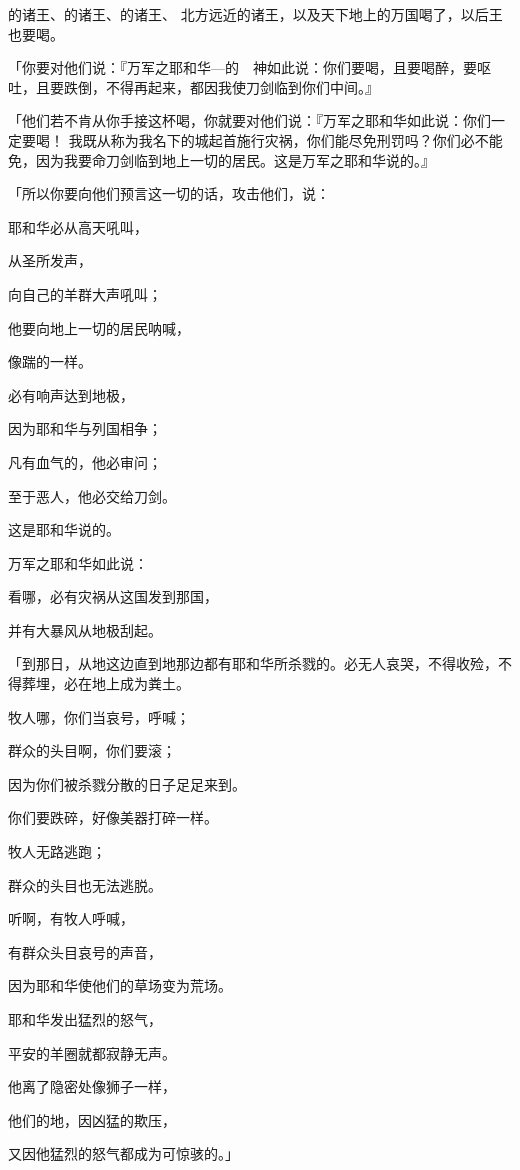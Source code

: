 {的诸王、{}的诸王、{}的诸王、
北方远近的诸王，以及天下地上的万国喝了，以后{}王也要喝。
\par }{\PP {}「你要对他们说：『万军之耶和华—{}的　神如此说：你们要喝，且要喝醉，要呕吐，且要跌倒，不得再起来，都因我使刀剑临到你们中间。』
\par }{\PP {}「他们若不肯从你手接这杯喝，你就要对他们说：『万军之耶和华如此说：你们一定要喝！
我既从称为我名下的城起首施行灾祸，你们能尽免刑罚吗？你们必不能免，因为我要命刀剑临到地上一切的居民。这是万军之耶和华说的。』
\par }{\PP {}「所以你要向他们预言这一切的话，攻击他们，说：
\par }{\Q 耶和华必从高天吼叫，
\par }{\Q 从圣所发声，
\par }{\Q 向自己的羊群大声吼叫；
\par }{\Q 他要向地上一切的居民呐喊，
\par }{\Q 像踹{}的一样。
\par }{\Q {}必有响声达到地极，
\par }{\Q 因为耶和华与列国相争；
\par }{\Q 凡有血气的，他必审问；
\par }{\Q 至于恶人，他必交给刀剑。
\par }{\Q 这是耶和华说的。
\par }{\BB \par }{\Q {}万军之耶和华如此说：
\par }{\Q 看哪，必有灾祸从这国发到那国，
\par }{\Q 并有大暴风从地极刮起。
\par }{\PP {}「到那日，从地这边直到地那边都有耶和华所杀戮的。必无人哀哭，不得收殓，不得葬埋，必在地上成为粪土。
\par }{\Q {}牧人哪，你们当哀号，呼喊；
\par }{\Q 群众的头目啊，你们要滚{}；
\par }{\Q 因为你们被杀戮分散的日子足足来到。
\par }{\Q 你们要跌碎，好像美器打碎一样。
\par }{\Q {}牧人无路逃跑；
\par }{\Q 群众的头目也无法逃脱。
\par }{\Q {}听啊，有牧人呼喊，
\par }{\Q 有群众头目哀号的声音，
\par }{\Q 因为耶和华使他们的草场变为荒场。
\par }{\Q {}耶和华发出猛烈的怒气，
\par }{\Q 平安的羊圈就都寂静无声。
\par }{\Q {}他离了隐密处像狮子一样，
\par }{\Q 他们的地，因{}凶猛的欺压，
\par }{\Q 又因他猛烈的怒气都成为可惊骇的。」

}
